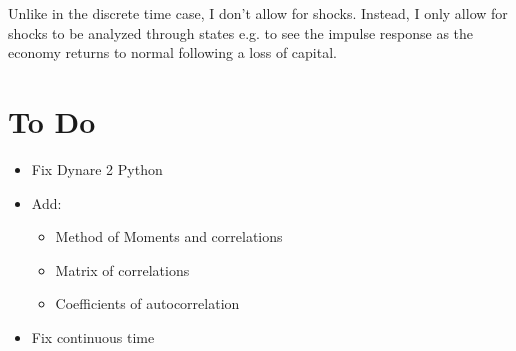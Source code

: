 \documentclass{article}
\theoremstyle{definition}
\begin{document}
Unlike in the discrete time case, I don't allow for shocks. Instead, I only allow for shocks to be analyzed through states e.g. to see the impulse response as the economy returns to normal following a loss of capital.

\section{To Do}
\begin{itemize}
    \item Fix Dynare 2 Python
    \item Add:
    \begin{itemize}
        \item Method of Moments and correlations
        \item Matrix of correlations
        \item Coefficients of autocorrelation
    \end{itemize}
    \item Fix continuous time
\end{itemize}
\end{document}
